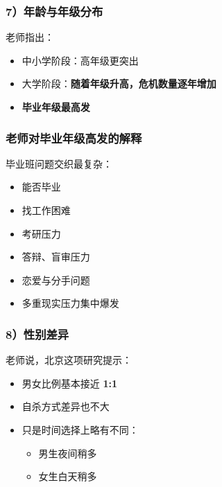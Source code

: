 \documentclass[
  chinese,
  9pt,
  a4paper,
]{ctexart}
\providecommand{\tightlist}{%
  \setlength{\itemsep}{0pt}\setlength{\parskip}{0pt}}
\begin{document}
\subsubsection{7）年龄与年级分布}\label{ux5e74ux9f84ux4e0eux5e74ux7ea7ux5206ux5e03}

老师指出：

\begin{itemize}
\tightlist
\item
  中小学阶段：高年级更突出
\item
  大学阶段：\textbf{随着年级升高，危机数量逐年增加}
\item
  \textbf{毕业年级最高发}
\end{itemize}

\subsubsection{老师对毕业年级高发的解释}\label{ux8001ux5e08ux5bf9ux6bd5ux4e1aux5e74ux7ea7ux9ad8ux53d1ux7684ux89e3ux91ca}

毕业班问题交织最复杂：

\begin{itemize}
\tightlist
\item
  能否毕业
\item
  找工作困难
\item
  考研压力
\item
  答辩、盲审压力
\item
  恋爱与分手问题
\item
  多重现实压力集中爆发
\end{itemize}

\subsubsection{8）性别差异}\label{ux6027ux522bux5deeux5f02}

老师说，北京这项研究提示：

\begin{itemize}
\item
  男女比例基本接近 \textbf{1:1}
\item
  自杀方式差异也不大
\item
  只是时间选择上略有不同：

  \begin{itemize}
  \tightlist
  \item
    男生夜间稍多
  \item
    女生白天稍多
  \end{itemize}
\end{itemize}
\end{document}
